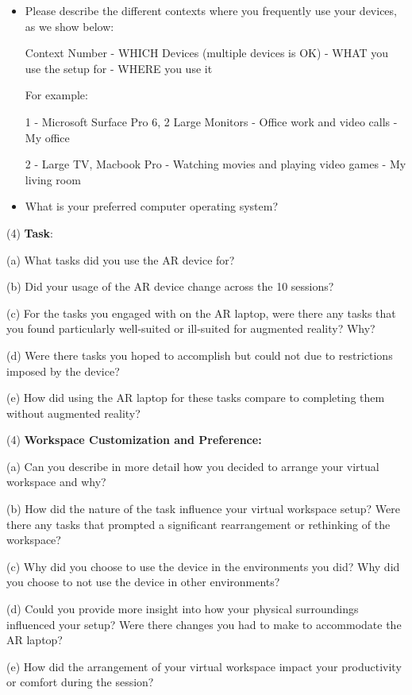 \begin{itemize}
    \item Please describe the different contexts where you frequently use your devices, as we show below:

Context Number - WHICH Devices (multiple devices is OK) - WHAT you use the setup for - WHERE you use it

For example:

1 - Microsoft Surface Pro 6, 2 Large Monitors - Office work and video calls - My office

2 - Large TV, Macbook Pro - Watching movies and playing video games - My living room 

\item What is your preferred computer operating system? 
\end{itemize}


(4) \textbf{Task}:

\quad (a) What tasks did you use the AR device for? 

\quad (b) Did your usage of the AR device change across the 10 sessions?

\quad (c) For the tasks you engaged with on the AR laptop, were there any tasks that you found particularly well-suited or ill-suited for augmented reality? Why?

\quad (d) Were there tasks you hoped to accomplish but could not due to restrictions imposed by the device?

\quad (e) How did using the AR laptop for these tasks compare to completing them without augmented reality?

(4) \textbf{Workspace Customization and Preference:}

\quad (a) Can you describe in more detail how you decided to arrange your virtual workspace and why?

\quad (b) How did the nature of the task influence your virtual workspace setup? Were there any tasks that prompted a significant rearrangement or rethinking of the workspace?

\quad (c) Why did you choose to use the device in the environments you did?
Why did you choose to not use the device in other environments?

\quad (d) Could you provide more insight into how your physical surroundings influenced your setup? Were there changes you had to make to accommodate the AR laptop?

\quad (e) How did the arrangement of your virtual workspace impact your productivity or comfort during the session?

